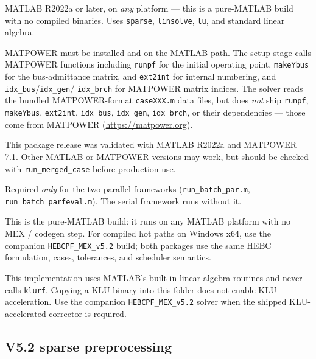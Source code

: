 \documentclass[11pt,a4paper]{article}
\newcommand{\code}[1]{\texttt{#1}}
\begin{document}
\begin{description}[leftmargin=0em,style=nextline]
\item[MATLAB (required).] MATLAB R2022a or later, on \emph{any} platform --- this is a
      pure-MATLAB build with no compiled binaries. Uses \code{sparse}, \code{linsolve},
      \code{lu}, and standard linear algebra.
\item[MATPOWER (required).] MATPOWER must be installed and on the MATLAB path. The setup
      stage calls MATPOWER functions including \code{runpf} for the initial operating
      point, \code{makeYbus} for the bus-admittance matrix, and
      \code{ext2int} for internal numbering, and \code{idx_bus}/\code{idx_gen}/
      \code{idx_brch} for MATPOWER matrix indices. The solver reads the
      bundled MATPOWER-format \code{caseXXX.m} data files, but does \emph{not} ship
      \code{runpf}, \code{makeYbus}, \code{ext2int}, \code{idx_bus}, \code{idx_gen},
      \code{idx_brch}, or their
      dependencies --- those come from MATPOWER (\url{https://matpower.org}).
\item[Validated setup.] This package release was validated with MATLAB R2022a and
      MATPOWER 7.1. Other MATLAB or MATPOWER versions may work, but should be checked with
      \code{run_merged_case} before production use.
\item[Parallel Computing Toolbox (optional).] Required \emph{only} for the two parallel
      frameworks (\code{run_batch_par.m}, \code{run_batch_parfeval.m}). The serial
      framework runs without it.
\item[No compiler needed.] This is the pure-MATLAB build: it runs on any MATLAB platform
      with no MEX / codegen step. For compiled hot paths on Windows x64, use the
      companion \code{HEBCPF_MEX_v5.2} build; both packages use the same HEBC formulation,
      cases, tolerances, and scheduler semantics.
\item[Linear-solver boundary.] This implementation uses MATLAB's built-in linear-algebra
      routines and never calls \code{klurf}. Copying a KLU binary into this folder does not
      enable KLU acceleration. Use the companion \code{HEBCPF_MEX_v5.2} solver when the
      shipped KLU-accelerated corrector is required.
\end{description}

\subsection{V5.2 sparse preprocessing}
\end{document}
